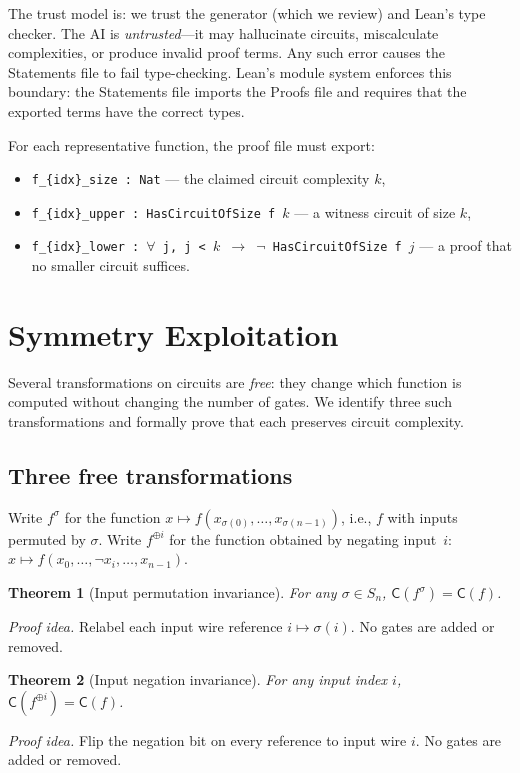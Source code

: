 \documentclass[11pt]{article}
\newtheorem{theorem}{Theorem}
\newcommand{\Sn}{S_n}
\newcommand{\CC}{\mathsf{C}}
\begin{document}
The trust model is: we trust the generator (which we review) and Lean's type
checker. The AI is \emph{untrusted}---it may hallucinate circuits, miscalculate
complexities, or produce invalid proof terms. Any such error causes the
Statements file to fail type-checking. Lean's module system enforces this
boundary: the Statements file imports the Proofs file and requires that the
exported terms have the correct types.

For each representative function, the proof file must export:
\begin{itemize}[leftmargin=*]
\item \texttt{f\_\{idx\}\_size : Nat} --- the claimed circuit complexity $k$,
\item \texttt{f\_\{idx\}\_upper : HasCircuitOfSize f $k$} --- a
  witness circuit of size $k$,
\item \texttt{f\_\{idx\}\_lower : $\forall$ j, j < $k$ $\to$ $\lnot$ HasCircuitOfSize f $j$}
  --- a proof that no smaller circuit suffices.
\end{itemize}

\section{Symmetry Exploitation}
\label{sec:symmetry}

Several transformations on circuits are \emph{free}: they change which function
is computed without changing the number of gates. We identify three such
transformations and formally prove that each preserves circuit complexity.

\subsection{Three free transformations}

Write $f^\sigma$ for the function $x \mapsto f(x_{\sigma(0)}, \ldots,
x_{\sigma(n-1)})$, i.e., $f$ with inputs permuted by $\sigma$.
Write $f^{\oplus i}$ for the function obtained by negating input~$i$:
$x \mapsto f(x_0, \ldots, \lnot x_i, \ldots, x_{n-1})$.

\begin{theorem}[Input permutation invariance]
For any $\sigma \in \Sn$,\; $\CC(f^\sigma) = \CC(f)$.
\end{theorem}
\noindent\textit{Proof idea.} Relabel each input wire reference $i \mapsto
\sigma(i)$. No gates are added or removed.

\begin{theorem}[Input negation invariance]
For any input index $i$,\; $\CC(f^{\oplus i}) = \CC(f)$.
\end{theorem}
\noindent\textit{Proof idea.} Flip the negation bit on every reference to input
wire $i$. No gates are added or removed.
\end{document}
